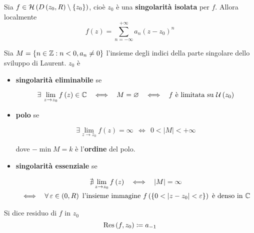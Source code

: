 \Soluzione
\begin{thm}
Sia $f\in \mathcal{H} \left( D\left( z_{0} ,R\right) \setminus \left\{z_{0}\right\}\right)$, cioè $z_{0}$ è una \textbf{singolarità isolata} per $f$. Allora localmente
\begin{equation*}
f\left( z\right) =\sum\limits ^{+\infty }_{n=-\infty } a_{n}\left( z-z_{0}\right)^{n}
\end{equation*}
\end{thm}
\begin{thm}
Sia $M=\left\{n\in \mathbb{Z}  :n< 0,a_{n} \neq 0\right\}$ l'insieme degli indici della parte singolare dello sviluppo di Laurent. $z_{0}$ è

\begin{itemize}
\item \textbf{singolarità eliminabile} se

\begin{equation*}
\exists \lim\limits _{z\rightarrow z_{0}} f\left( z\right) \in \CC  \ \ \iff \ \ M=\emptyset \ \ \iff \ \ f\ \text{è limitata su} \ \Uc \left( z_{0}\right)
\end{equation*}
\item \textbf{polo} se

\begin{equation*}
\exists \lim\limits _{z\rightarrow z_{0}} f\left( z\right) =\infty \ \ \iff \ \ 0< \left| M\right| < +\infty 
\end{equation*}

dove $-\min M=k$ è l'\textbf{ordine} del polo.
\item \textbf{singolarità essenziale} se

\begin{gather*}
\nexists \lim\limits _{z\rightarrow z_{0}} f\left( z\right) \ \ \iff \ \ \left| M\right| =\infty \\
\iff \ \ \forall \varepsilon \in \left( 0,R\right) \ \text{l'insieme immagine} \ f\left(\left\{0< \left| z-z_{0}\right| < \varepsilon \right\}\right) \ \text{è denso in} \ \CC 
\end{gather*}
\end{itemize}
\end{thm}
\begin{defn}
Si dice residuo di $f$ in $z_{0}$
\begin{equation*}
\operatorname{Res} \left( f,z_{0}\right) \coloneqq a_{-1}
\end{equation*}
\end{defn}
